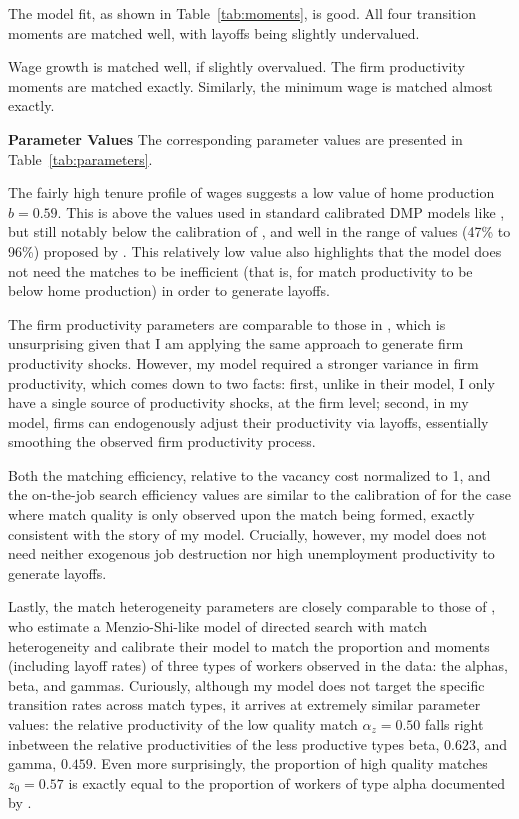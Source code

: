 The model fit, as shown in Table~\ref{tab:moments}, is good. All four transition moments are matched well, with layoffs being slightly undervalued.

Wage growth is matched well, if slightly overvalued. The firm productivity moments are matched exactly. Similarly, the minimum wage is matched almost exactly.


\textbf{Parameter Values} The corresponding parameter values are presented in Table~\ref{tab:parameters}.

The fairly high tenure profile of wages suggests a low value of home production $b=0.59$. This is above the values used in standard calibrated DMP models like \textcite{shimer2005}, but still notably below the calibration of \textcite{hagedorn2008}, and well in the range of values (47\% to 96\%) proposed by \textcite{chodorow2016}. This relatively low value also highlights that the model does not need the matches to be inefficient (that is, for match productivity to be below home production) in order to generate layoffs.

The firm productivity parameters are comparable to those in \textcite{balke2022}, which is unsurprising given that I am applying the same approach to generate firm productivity shocks. However, my model required a stronger variance in firm productivity, which comes down to two facts: first, unlike in their model, I only have a single source of productivity shocks, at the firm level; second, in my model, firms can endogenously adjust their productivity via layoffs, essentially smoothing the observed firm productivity process.

Both the matching efficiency, relative to the vacancy cost normalized to 1, and the on-the-job search efficiency values are similar to the calibration of \textcite{menzio2011} for the case where match quality is only observed upon the match being formed, exactly consistent with the story of my model. Crucially, however, my model does not need neither exogenous job destruction nor high unemployment productivity to generate layoffs.

Lastly, the match heterogeneity parameters are closely comparable to those of \textcite{gregory2021}, who estimate a Menzio-Shi-like model of directed search with match heterogeneity and calibrate their model to match the proportion and moments (including layoff rates) of three types of workers observed in the data: the alphas, beta, and gammas. Curiously, although my model does not target the specific transition rates across match types, it arrives at extremely similar parameter values: the relative productivity of the low quality match $\alpha_z=0.50$ falls right inbetween the relative productivities of the less productive types beta, $0.623$, and gamma, $0.459$. 
Even more surprisingly, the proportion of high quality matches $z_0=0.57$ is exactly equal to the proportion of workers of type alpha documented by \textcite{gregory2021}.

